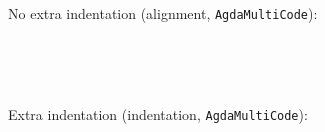 \documentclass{article}
\begin{document}
\noindent No extra indentation (alignment, \texttt{AgdaMultiCode}):
\begin{AgdaMultiCode}
\begin{code}[hide]%
%
\>[2]\AgdaFunction{\AgdaUnderscore{}}\AgdaSpace{}%
\AgdaSymbol{:}\AgdaSpace{}%
\<%
\\
%
\>[2]\AgdaSymbol{\AgdaUnderscore{}}%
\>[14I]\AgdaSymbol{=}\<%
\end{code}
\begin{code}%
\>[.][@{}l@{}]\<[14I]%
\>[4]\<%
\end{code}
\begin{code}[hide]%
%
\>[2]\AgdaFunction{\AgdaUnderscore{}}\AgdaSpace{}%
\AgdaSymbol{:}\AgdaSpace{}%
\<%
\\
%
\>[2]\AgdaSymbol{\AgdaUnderscore{}}%
\>[17I]\AgdaSymbol{=}\<%
\end{code}
\begin{code}%
\>[.][@{}l@{}]\<[17I]%
\>[4]\<%
\end{code}
\end{AgdaMultiCode}

\noindent Extra indentation (indentation, \texttt{AgdaMultiCode}):
\begin{AgdaMultiCode}
\begin{code}[hide]%
%
\>[2]\AgdaFunction{\AgdaUnderscore{}}\AgdaSpace{}%
\AgdaSymbol{:}\AgdaSpace{}%
\<%
\\
%
\>[2]\AgdaSymbol{\AgdaUnderscore{}}%
\>[20I]\AgdaSymbol{=}\<%
\end{code}
\begin{code}%
\>[20I][@{}l@{\AgdaIndent{1}}]%
\>[5]\<%
\end{code}
\begin{code}[hide]%
%
\>[2]\AgdaFunction{\AgdaUnderscore{}}\AgdaSpace{}%
\AgdaSymbol{:}\AgdaSpace{}%
\<%
\\
%
\>[2]\AgdaSymbol{\AgdaUnderscore{}}%
\>[23I]\AgdaSymbol{=}\<%
\end{code}
\begin{code}%
\>[23I][@{}l@{\AgdaIndent{1}}]%
\>[5]\<%
\end{code}
\end{AgdaMultiCode}
\end{document}
